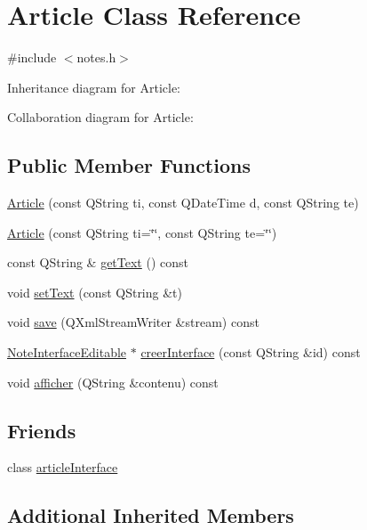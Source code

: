 \hypertarget{classArticle}{}\section{Article Class Reference}
\label{classArticle}


{\ttfamily \#include $<$notes.\+h$>$}



Inheritance diagram for Article\+:


Collaboration diagram for Article\+:
\subsection*{Public Member Functions}
\begin{DoxyCompactItemize}
\item 
\hyperlink{classArticle_a0f8481cad6354b7b40b4a33d56b6c773}{Article} (const Q\+String ti, const Q\+Date\+Time d, const Q\+String te)
\item 
\hyperlink{classArticle_a3d9be271173996a6c099bdd591ea9463}{Article} (const Q\+String ti=\char`\"{}\char`\"{}, const Q\+String te=\char`\"{}\char`\"{})
\item 
const Q\+String \& \hyperlink{classArticle_a9698d53f05f9b21c03a9acf891e9275e}{get\+Text} () const 
\item 
void \hyperlink{classArticle_a7144942027b1761cfcbd21761dd5cee8}{set\+Text} (const Q\+String \&t)
\item 
void \hyperlink{classArticle_a5489b53efe0b6bb043933928eecaf3df}{save} (Q\+Xml\+Stream\+Writer \&stream) const 
\item 
\hyperlink{classNoteInterfaceEditable}{Note\+Interface\+Editable} $\ast$ \hyperlink{classArticle_a6de9b9126727b1e794baaa45926e97a8}{creer\+Interface} (const Q\+String \&id) const 
\item 
void \hyperlink{classArticle_a9b70265df89e6b3d0de0f3af9d8bc229}{afficher} (Q\+String \&contenu) const 
\end{DoxyCompactItemize}
\subsection*{Friends}
\begin{DoxyCompactItemize}
\item 
class \hyperlink{classArticle_a1b61100356afbfa0857a78513cf99160}{article\+Interface}
\end{DoxyCompactItemize}
\subsection*{Additional Inherited Members}


